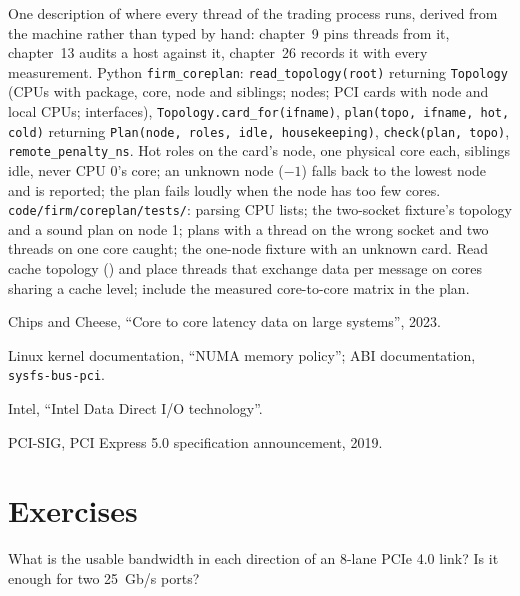 \begin{build}
 One description of where every thread of the trading process runs, derived from the machine rather than
typed by hand: chapter~9 pins threads from it, chapter~13 audits a host against it, chapter~26 records it with every
measurement.
 Python \texttt{firm\_coreplan}: \texttt{read\_topology(root)} returning \texttt{Topology} (CPUs with
package, core, node and siblings; nodes; PCI cards with node and local CPUs; interfaces), \texttt{Topology.card\_for(ifname)},
\texttt{plan(topo, ifname, hot, cold)} returning \texttt{Plan(node, roles, idle, housekeeping)}, \texttt{check(plan,
topo)}, \texttt{remote\_penalty\_ns}.
 Hot roles on the card's node, one physical core each, siblings idle, never CPU 0's core; an unknown node
($-1$) falls back to the lowest node and is reported; the plan fails loudly when the node has too few cores.
 \texttt{code/firm/coreplan/tests/}: parsing CPU lists; the two-socket fixture's topology and a
sound plan on node 1; plans with a thread on the wrong socket and two threads on one core caught; the one-node fixture with
an unknown card.
 Read cache topology () and place threads that exchange data per
message on cores sharing a cache level; include the measured core-to-core matrix in the plan.
\end{build}

\begin{omsources}
\item Chips and Cheese, ``Core to core latency data on large systems'', 2023.
\item Linux kernel documentation, ``NUMA memory policy''; ABI documentation, \texttt{sysfs-bus-pci}.
\item Intel, ``Intel Data Direct I/O technology''.
\item PCI-SIG, PCI Express 5.0 specification announcement, 2019.
\end{omsources}

\section{Exercises}

\begin{exercise}[$\star$]\label{exo:ll:multi-socket-machines-and-interconnects:1}
What is the usable bandwidth in each direction of an 8-lane PCIe 4.0 link? Is it enough for two 25~Gb/s ports?
\end{exercise}


